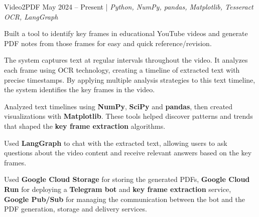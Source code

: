 \resumeSubheadings
{Video2PDF }
{May 2024 -- Present}
{}{}{| \textit{Python, NumPy, pandas, Matplotlib, Tesseract OCR, LangGraph}}
\resumeItemListStart
\item Built a tool to identify key frames in educational YouTube videos and generate PDF notes from those frames for easy and quick reference/revision.
\item The system captures text at regular intervals throughout the video. It analyzes each frame using OCR technology, creating a timeline of extracted text with precise timestamps. By applying multiple analysis strategies to this text timeline, the system identifies the key frames in the video.
\item Analyzed text timelines using \textbf{NumPy}, \textbf{SciPy} and \textbf{pandas}, then created visualizations with \textbf{Matplotlib}. These tools helped discover patterns and trends that shaped the \textbf{key frame extraction} algorithms.
\item Used \textbf{LangGraph} to chat with the extracted text, allowing users to ask questions about the video content and receive relevant answers based on the key frames.
\item Used \textbf{Google Cloud Storage} for storing the generated PDFs, \textbf{Google Cloud Run} for deploying a \textbf{Telegram bot} and \textbf{key frame extraction} service, \textbf{Google Pub/Sub} for managing the communication between the bot and the PDF generation, storage and delivery services.
\resumeItemListEnd